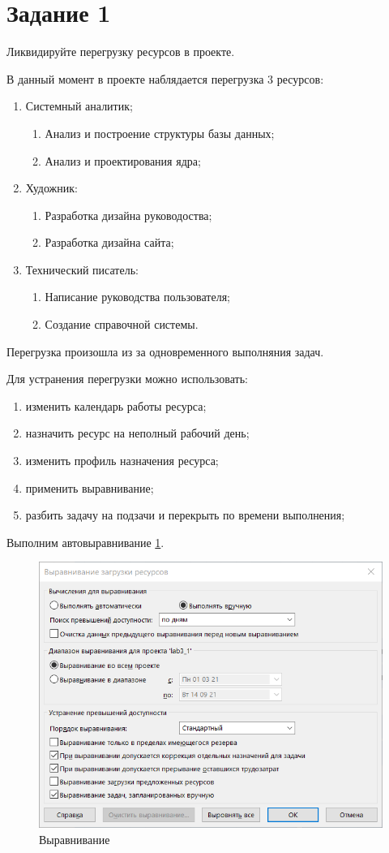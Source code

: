 \section{Задание 1}

Ликвидируйте перегрузку ресурсов в проекте.

В данный момент в проекте наблядается перегрузка 3 ресурсов:
\begin{enumerate}
	\item Системный аналитик;
	\begin{enumerate}
		\item Анализ и построение структуры базы данных;
		\item Анализ и проектирования ядра;
	\end{enumerate}
	\item Художник:
	\begin{enumerate}
		\item Разработка дизайна руководоства;
		\item Разработка дизайна сайта;
	\end{enumerate}
	\item Технический писатель:
	\begin{enumerate}
		\item Написание руководства пользователя;
		\item Создание справочной системы.
	\end{enumerate}
\end{enumerate}

Перегрузка произошла из за одновременного выполняния задач.

Для устранения перегрузки можно использовать:
\begin{enumerate}
	\item изменить календарь работы ресурса;
	\item назначить ресурс на неполный рабочий день;
	\item изменить профиль назначения ресурса;
	\item применить выравнивание;
	\item разбить задачу на подзачи и перекрыть по времени выполнения;
\end{enumerate}

Выполним автовыравнивание \ref{fig:lab311}.
\begin{figure}[H]
	\centering
	\includegraphics[width=0.7\linewidth]{src/lab3_1_1}
	\caption{Выравнивание}
	\label{fig:lab311}
\end{figure}

